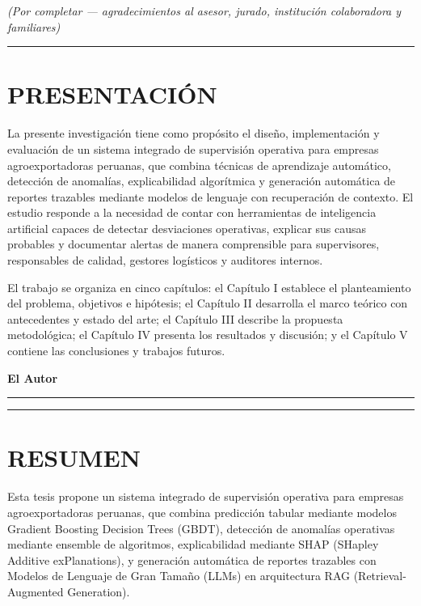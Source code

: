 \emph{(Por completar --- agradecimientos al asesor, jurado, institución
colaboradora y familiares)}

\begin{center}\rule{0.5\linewidth}{0.5pt}\end{center}

\section{PRESENTACIÓN}\label{presentaciuxf3n}

La presente investigación tiene como propósito el diseño, implementación
y evaluación de un sistema integrado de supervisión operativa para
empresas agroexportadoras peruanas, que combina técnicas de aprendizaje
automático, detección de anomalías, explicabilidad algorítmica y
generación automática de reportes trazables mediante modelos de lenguaje
con recuperación de contexto. El estudio responde a la necesidad de
contar con herramientas de inteligencia artificial capaces de detectar
desviaciones operativas, explicar sus causas probables y documentar
alertas de manera comprensible para supervisores, responsables de
calidad, gestores logísticos y auditores internos.

El trabajo se organiza en cinco capítulos: el Capítulo I establece el
planteamiento del problema, objetivos e hipótesis; el Capítulo II
desarrolla el marco teórico con antecedentes y estado del arte; el
Capítulo III describe la propuesta metodológica; el Capítulo IV presenta
los resultados y discusión; y el Capítulo V contiene las conclusiones y
trabajos futuros.

\textbf{El Autor}

\begin{center}\rule{0.5\linewidth}{0.5pt}\end{center}

\begin{center}\rule{0.5\linewidth}{0.5pt}\end{center}

\section{RESUMEN}\label{resumen}

Esta tesis propone un sistema integrado de supervisión operativa para
empresas agroexportadoras peruanas, que combina predicción tabular
mediante modelos Gradient Boosting Decision Trees (GBDT), detección de
anomalías operativas mediante ensemble de algoritmos, explicabilidad
mediante SHAP (SHapley Additive exPlanations), y generación automática
de reportes trazables con Modelos de Lenguaje de Gran Tamaño (LLMs) en
arquitectura RAG (Retrieval-Augmented Generation).

